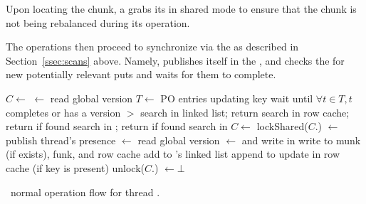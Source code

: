 Upon locating the chunk,  a  grabs its  in shared mode to ensure that the chunk is not being rebalanced during its operation. 

The operations then proceed to synchronize via the  
as described in Section~\ref{ssec:scans} above. Namely,   publishes itself 
in the  , and   
checks the   for new potentially relevant puts and waits for them to complete. 


\begin{algorithm}[tb]
\begin{algorithmic}[1]{}
		\State $C \leftarrow$ 
		\State {} $\leftarrow$    \Comment read global version
		\State  $T \leftarrow $  PO entries updating key 
		\State wait until $\forall t \in T, t$  completes or has a version $>$   
			\State search  in  linked list;  return 
		\EndIf
		\State search  in row cache; return  if found
			\State	search  in ; return  if found
		\EndIf
		\State	search  in 	
\EndProcedure
\Statex
{}	
		\State $C \leftarrow$ 
		\State lockShared($C$.)
		\State  {}  $\leftarrow$ 
			 \Comment publish  thread's presence 
		\State {} $\leftarrow$    \Comment read global version
		\State  {}  $\leftarrow$ 
			\Comment and write in 
		\Statex \Comment write  to munk (if exists), funk, and row cache  
			\State add   to 's linked list
		\EndIf
		\State append  to 
		\State update  in row cache (if key is present)
		\State unlock($C$.)
		\State {}  $\leftarrow \bot$ 
\EndProcedure
\end{algorithmic}
\caption{\sys\ normal operation flow for thread .}
\label{alg:ops}
\end{algorithm}



